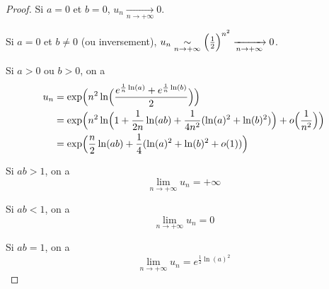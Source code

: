 \begin{proof}
	Si $a=0$ et $b=0$, $u_{n}\xrightarrow[n\to+\infty]{}0$.

	Si $a=0$ et $b\neq0$ (ou inversement), $u_{n}\underset{n\to+\infty}{\sim}\Bigl(\frac{1}{2}\Bigr)^{n^{2}}\xrightarrow[n\to+\infty]{}0$.

	Si $a>0$ ou $b>0$, on a
	\begin{align}
		u_{n}
		&=\exp\Bigl(n^{2}\ln\Bigl(\frac{e^{\frac{1}{n}\ln(a)}+e^{\frac{1}{n}\ln(b)}}{2}\Bigr)\Bigr)\\
		&=\exp\Bigl(n^{2}\ln\Bigl(1+\frac{1}{2n}\ln(ab)+\frac{1}{4n^2}(\ln(a)^{2}+\ln(b)^{2})\Bigr)+o\Bigl(\frac{1}{n^{2}}\Bigr)\Bigr)\\
		&=\exp\Bigl(\frac{n}{2}\ln(ab)+\frac{1}{4}(\ln(a)^{2}+\ln(b)^{2}+o(1))\Bigr)
	\end{align}

	Si $ab>1$, on a 
	\begin{equation}\boxed{\lim\limits_{n\to+\infty} u_{n}=+\infty}\end{equation}
	
	Si $ab<1$, on a 
	\begin{equation}\boxed{\lim\limits_{n\to+\infty} u_{n}=0}\end{equation}

	Si $ab=1$, on a 
	\begin{equation}\boxed{\lim\limits_{n\to+\infty} u_{n}=e^{\frac{1}{2}\ln(a)^{2}}}\end{equation}
\end{proof}

